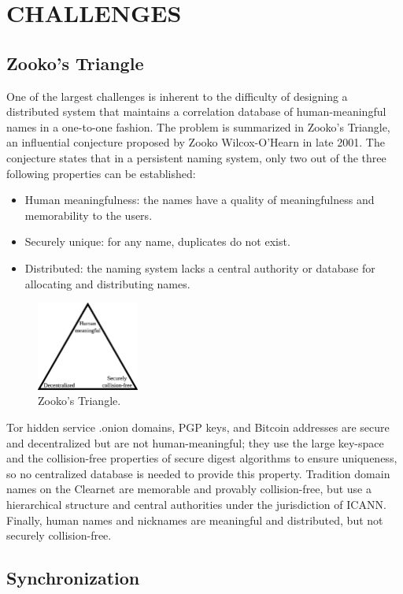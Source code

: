 
\chapter{CHALLENGES}

\section{Zooko's Triangle}

One of the largest challenges is inherent to the difficulty of designing a distributed system that maintains a correlation database of human-meaningful names in a one-to-one fashion. The problem is summarized in Zooko's Triangle, an influential conjecture proposed by Zooko Wilcox-O'Hearn in late 2001. The conjecture states that in a persistent naming system, only two out of the three following properties can be established:\cite{ferdous2009security}

\begin{itemize}
  \item Human meaningfulness: the names have a quality of meaningfulness and memorability to the users. 
  \item Securely unique: for any name, duplicates do not exist.
  \item Distributed: the naming system lacks a central authority or database for allocating and distributing names.
\end{itemize}

\begin{figure}[htbp]
	\centering
	\includegraphics[width=0.3\textwidth]{images/Zooko.eps}
	\caption{Zooko's Triangle.}
\end{figure}

Tor hidden service .onion domains, PGP keys, and Bitcoin addresses are secure and decentralized but are not human-meaningful; they use the large key-space and the collision-free properties of secure digest algorithms to ensure uniqueness, so no centralized database is needed to provide this property. Tradition domain names on the Clearnet are memorable and provably collision-free, but use a hierarchical structure and central authorities under the jurisdiction of ICANN. Finally, human names and nicknames are meaningful and distributed, but not securely collision-free.\cite{stiegler2005petname}

\section{Synchronization}



